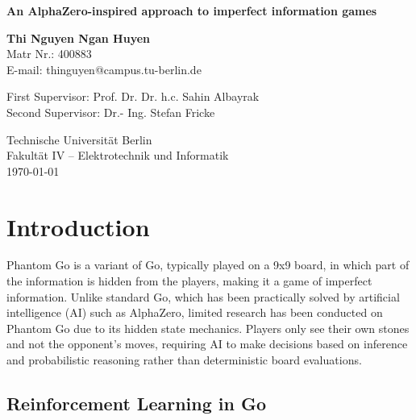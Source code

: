 \documentclass[12pt,oneside,openright]{article}
\newcommand{\topic}
{An AlphaZero-inspired approach to imperfect information games}
\begin{document}
\date{\today}
\begin{center}
    \vspace*{1cm}
    \Huge
    \textbf{\topic}
    \LARGE

    \vspace{2cm}

    \textbf{Thi Nguyen Ngan Huyen}\\
    \vspace{0.5cm}
    \normalsize
    Matr Nr.: 400883\\
    E-mail: thinguyen@campus.tu-berlin.de
    \vspace{2cm}

    \large
    \begin{center}
        First Supervisor: Prof. Dr. Dr. h.c. Sahin Albayrak \\
        Second Supervisor: Dr.- Ing. Stefan Fricke
    \end{center}        \vspace{0.8cm}

    \Large
    Technische Universität Berlin\\
    Fakultät IV – Elektrotechnik und Informatik\\
    \vspace{1cm}
    \today
\end{center}
\newpage

\section{Introduction}

Phantom Go is a variant of Go, typically played on a 9x9 board,
in which part of the information is hidden from the players, making it a game of imperfect information. Unlike standard Go, which has been practically solved by artificial intelligence (AI) such as AlphaZero, limited research has been conducted on Phantom Go due to its hidden state mechanics. Players only see their own stones and not the opponent’s moves, requiring AI to make decisions based on inference and probabilistic reasoning rather than deterministic board evaluations.

\subsection{Reinforcement Learning in Go}
\end{document}
